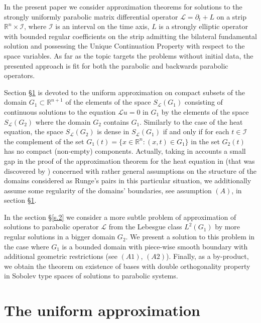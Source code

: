 \documentclass{amsart}
\theoremstyle{definition}
\theoremstyle{remark}
\numberwithin{equation}{section}
\begin{document}
In the present paper we consider approximation theorems for solutions to the strongly uniformly 
parabolic matrix differential operator ${\mathcal L} = \partial _t + L$ on a strip ${\mathbb R}^{n} 
\times \mathcal{I} $, where $\mathcal{I} $ is an interval on the time axis, $L$ is a strongly 
elliptic operator with bounded regular coefficients on the strip admitting the bilateral 
fundamental solution and possessing the Unique Continuation Property with respect to the space 
variables. As far as the topic targets the problems without initial data, the presented 
approach is fit for both the parabolic and backwards parabolic operators.  

Section \S \ref{s.1} is devoted to the uniform approximation on compact subsets of the domain 
$G_1 \subset {\mathbb R}^{n+1}$ of the elements of the space $S_{\mathcal L} (G_1)$  
consisting of continuous solutions to the equation ${\mathcal L} u = 0$ in $G_1$ by the 
elements of the space $S_{\mathcal L} (G_2)$ where the domain $G_2$ contains $G_1$. Similarly 
to the case of the heat equation, the space $S_{\mathcal L} (G_2)$ is dense in $S_{\mathcal L} 
(G_1)$ if and only if for each $t \in {\mathcal I}$ the complement of the set $G_1 (t) = \{x \in 
{\mathbb R}^n: (x,t) \in G_1\}$  in the set $G_2 (t)$ has no compact (non-empty) components. 
Actually, taking in accounts a small gap in the proof of the approximation theorem for the  
heat equation in \cite{D80} (that was discovered by \cite{GauTa10}) concerned with rather 
general assumptions on the structure of the domains considered as Runge's pairs in this 
particular situation,  we additionally assume some regularity of the domains' boundaries, see 
assumption $(A)$, in section \S \ref{s.1}.

In the section \S \ref{s.2} we consider a more subtle problem of approximation 
of solutions to parabolic operator ${\mathcal L}$ from the Lebesgue class 
 $L^2(G_1)$  by more regular solutions in a bigger domain $G_2$. 
We present a solution to this problem in the case where $G_1$ is a bounded 
domain with piece-wise smooth boundary with additional geometric restrictions (see $(A1)$, 
$(A2)$). Finally, as a by-product, we obtain the theorem on existence of bases with double 
orthogonality property in Sobolev type spaces of solutions to parabolic systems.  

\section{The uniform approximation}
\label{s.1}
\end{document}
